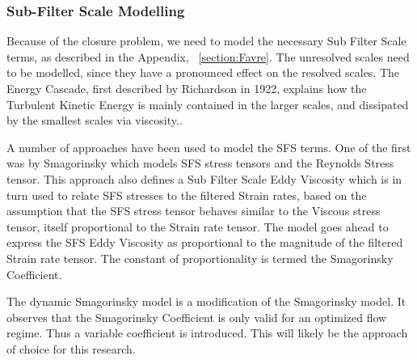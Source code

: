 \subsubsection{Sub-Filter Scale Modelling}
Because of the closure problem, we need to model the necessary Sub Filter Scale terms, as described in the Appendix, ~\ref{section:Favre}.
The unresolved scales need to be modelled, since they have a pronounced effect on the resolved scales. The Energy Cascade, first described by Richardson in 1922, explains how the Turbulent Kinetic Energy is mainly contained in the larger scales, and dissipated by the smallest scales via viscosity.\cite{Pope:2005}.\par
A number of approaches have been used to model the SFS terms. One of the first was by Smagorinsky \cite{Smagorinsky:1963} which models SFS stress tensors and the Reynolds Stress tensor. This approach also defines a Sub Filter Scale Eddy Viscosity which is in turn used to relate SFS stresses to the filtered Strain rates, based on the assumption that the SFS stress tensor behaves similar to the Viscous stress tensor, itself proportional to the Strain rate tensor. The model goes ahead to express the SFS Eddy Viscosity as proportional to the magnitude of the filtered Strain rate tensor. The constant of proportionality is termed the Smagorinsky Coefficient.

The dynamic Smagorinsky model is a modification of the Smagorinsky model. It observes that the Smagorinsky Coefficient is only valid for an optimized flow regime. Thus a variable coefficient is introduced. This will likely be the approach of choice for this research.